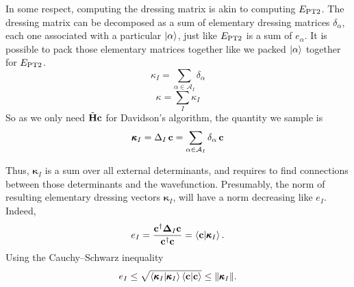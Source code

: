 \documentclass[./thesis.tex]{subfiles}
\begin{document}
In some respect, computing the dressing matrix is akin to computing $E_\text{PT2}$. The dressing matrix can be decomposed as a sum of elementary dressing matrices $\delta_\alpha$, each one associated with a particular $\ket \alpha$, just like $E_\text{PT2}$ is a sum of $e_\alpha$. It is possible to pack those elementary matrices together like we packed $\ket \alpha$ together for $E_\text{PT2}$.
\begin{equation}
\kappa_I = \sum_{\alpha \in \mathcal{A}_I} \delta_\alpha
\end{equation}
\begin{equation}
\kappa = \sum_{I} \kappa_I
\end{equation}
So as we only need $\tilde{\bf H}{\bf c}$ for Davidson's algorithm, the quantity we sample is 
\begin{equation}
{\pmb \kappa}_I = \Delta_I\, {\bf c} = \sum_{\alpha \in \mathcal{A}_I} \delta_\alpha\, {\bf c}
\end{equation}

Thus, ${\pmb \kappa}_I$ is a sum over all external determinants, and requires to find connections between those determinants and the wavefunction. Presumably, the norm of resulting elementary dressing vectors $\pmb \kappa_I$, will have a norm decreasing like $e_I$. Indeed, 
\begin{equation}
e_I = \frac{{\bf c}^\dagger {\bf \Delta}_I {\bf c}}{{\bf c}^\dagger {\bf c}} = \braket{\bf c}{\pmb \kappa_I}.
\label{eq:c_kappa_i}
\end{equation}
Using the Cauchy–Schwarz inequality
\begin{equation}
e_I \le \sqrt{ \braket{{\pmb \kappa}_I}{{\pmb \kappa}_I} \braket{\bf c}{\bf c} } \le
\norm{{\pmb \kappa}_I}.
\end{equation}
\end{document}
